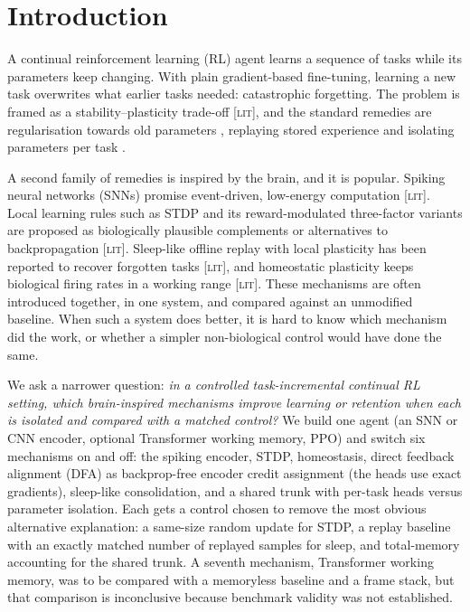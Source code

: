 \documentclass[10pt]{article}
\newcommand{\lit}{\textsc{[lit]}\xspace}
\begin{document}
\section{Introduction}
\label{sec:intro}

A continual reinforcement learning (RL) agent learns a sequence of tasks while its parameters keep changing. With
plain gradient-based fine-tuning, learning a new task overwrites what earlier tasks needed: catastrophic
forgetting. The problem is framed as a stability--plasticity trade-off \lit \citep{khetarpal2022towards,
kirkpatrick2017overcoming}, and the standard remedies are regularisation towards old parameters
\citep[EWC;][]{kirkpatrick2017overcoming}, replaying stored experience \citep[CLEAR;][]{rolnick2019experience} and
isolating parameters per task \citep[e.g. PackNet;][]{mallya2018packnet}.

A second family of remedies is inspired by the brain, and it is popular. Spiking neural networks (SNNs) promise
event-driven, low-energy computation \lit \citep{fang2023spikingjelly, zhou2026spikingformer}. Local learning rules
such as STDP and its reward-modulated three-factor variants are proposed as biologically plausible complements or
alternatives to backpropagation \lit \citep{lee2025brain, huo2025research}. Sleep-like offline replay with local
plasticity has been reported to recover forgotten tasks \lit \citep{tadros2022sleep}, and homeostatic plasticity
keeps biological firing rates in a working range \lit \citep{turrigiano2004homeostatic}. These mechanisms are often
introduced together, in one system, and compared against an unmodified baseline. When such a system does better, it
is hard to know which mechanism did the work, or whether a simpler non-biological control would have done the same.

We ask a narrower question: \emph{in a controlled task-incremental continual RL setting, which brain-inspired
mechanisms improve learning or retention when each is isolated and compared with a matched control?} We build one
agent (an SNN or CNN encoder, optional Transformer working memory, PPO) and switch six mechanisms on and off: the
spiking encoder, STDP, homeostasis, direct feedback alignment (DFA) as backprop-free encoder credit assignment (the
heads use exact gradients), sleep-like consolidation, and a shared trunk with per-task heads versus parameter
isolation. Each gets a control chosen to remove the most obvious alternative explanation: a same-size random update
for STDP, a replay baseline with an exactly matched number of replayed samples for sleep, and total-memory accounting
for the shared trunk. A seventh mechanism, Transformer working memory, was to be compared with a memoryless baseline
and a frame stack, but that comparison is inconclusive because benchmark validity was not established.
\end{document}
